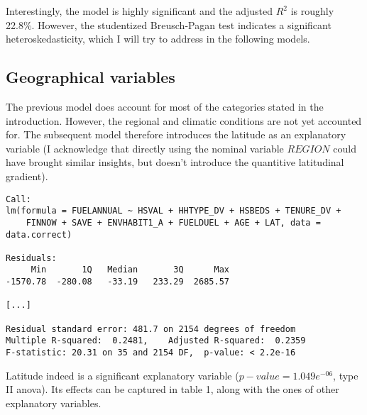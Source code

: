 \documentclass[12pt]{article}
\begin{document}
Interestingly, the model is highly significant and the adjusted $R^2$ is roughly 22.8\%. However, the studentized Breusch-Pagan test indicates a significant heteroskedasticity, which I will try to address in the following models.

\subsection{Geographical variables}

The previous model does account for most of the categories stated in the introduction. However, the regional and climatic conditions are not yet accounted for. The subsequent model therefore introduces the latitude as an explanatory variable (I acknowledge that directly using the nominal variable $REGION$ could have brought similar insights, but doesn't introduce the quantitive latitudinal gradient).

\begin{Answer}
\begin{verbatim}
Call:
lm(formula = FUELANNUAL ~ HSVAL + HHTYPE_DV + HSBEDS + TENURE_DV + 
    FINNOW + SAVE + ENVHABIT1_A + FUELDUEL + AGE + LAT, data = data.correct)

Residuals:
     Min       1Q   Median       3Q      Max 
-1570.78  -280.08   -33.19   233.29  2685.57 

[...]

Residual standard error: 481.7 on 2154 degrees of freedom
Multiple R-squared:  0.2481,	Adjusted R-squared:  0.2359 
F-statistic: 20.31 on 35 and 2154 DF,  p-value: < 2.2e-16
\end{verbatim}
\end{Answer}

Latitude indeed is a significant explanatory variable ($p-value = 1.049e^{-06}$, type II anova). Its effects can be captured in table 1, along with the ones of other explanatory variables.\\
\end{document}
